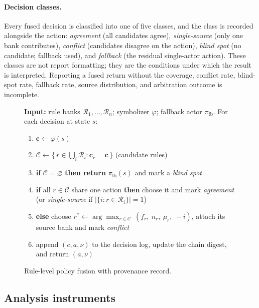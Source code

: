 \documentclass[11pt]{article}
\begin{document}
\paragraph{Decision classes.}
Every fused decision is classified into one of five classes, and the class is recorded alongside the
action: \emph{agreement} (all candidates agree), \emph{single-source} (only one bank contributes),
\emph{conflict} (candidates disagree on the action), \emph{blind spot} (no candidate; fallback used),
and \emph{fallback} (the residual single-actor action). These classes are not report formatting; they
are the conditions under which the result is interpreted. Reporting a fused return without the
coverage, conflict rate, blind-spot rate, fallback rate, source distribution, and arbitration outcome
is incomplete.
\begin{figure}[t]
\centering
\caption{Rule-level policy fusion with provenance record.}
\label{alg:fusion}
\begin{minipage}{0.9\textwidth}
\small
\textbf{Input:} rule banks $\mathcal{R}_1,\ldots,\mathcal{R}_n$; symbolizer $\varphi$; fallback actor $\pi_{\mathrm{fb}}$.\newline
For each decision at state $s$:
\begin{enumerate}
  \item $\mathbf{c}\leftarrow \varphi(s)$
  \item $\mathcal{C}\leftarrow\{\,r\in\bigcup_i\mathcal{R}_i : \mathbf{c}_r=\mathbf{c}\,\}$ \hfill (candidate rules)
  \item \textbf{if} $\mathcal{C}=\varnothing$ \textbf{then return} $\pi_{\mathrm{fb}}(s)$ and mark a \emph{blind spot}
  \item \textbf{if} all $r\in\mathcal{C}$ share one action \textbf{then} choose it and mark \emph{agreement} (or \emph{single-source} if $|\{i:r\in\mathcal{R}_i\}|=1$)
  \item \textbf{else} choose $r^{*}\leftarrow \arg\max_{r\in\mathcal{C}}\ (f_r,\ n_r,\ \mu_r,\ -i)$, attach its source bank and mark \emph{conflict}
  \item append $(c,a,\nu)$ to the decision log, update the chain digest, and return $(a,\nu)$
\end{enumerate}
\end{minipage}
\end{figure}

\subsection{Analysis instruments}
\label{sec:method:instruments}
\end{document}
